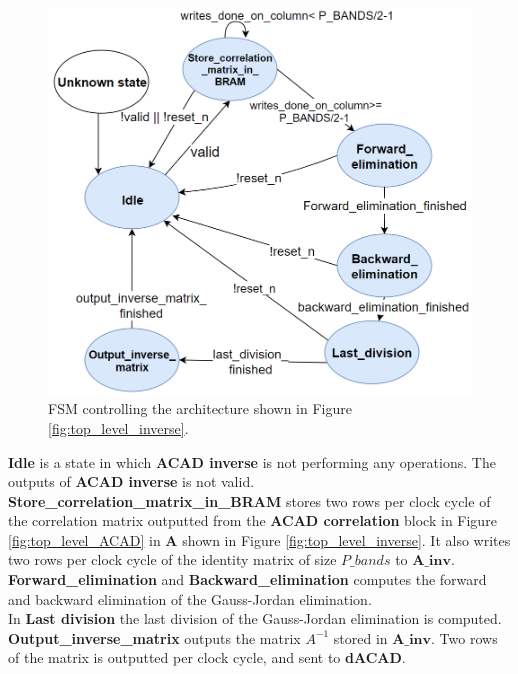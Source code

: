 \begin{figure}[H]
\centering
   \includegraphics[scale=0.3]{images/inverse_hw/fsm_inverse_matrix.PNG}
  \caption{FSM controlling the architecture shown in Figure \ref{fig:top_level_inverse}.  } 
  \label{fig:fsm_inverse_matrix}
\end{figure}


\textbf{Idle} is a state in which \textbf{ACAD inverse} is not performing any operations. The outputs of \textbf{ACAD inverse} is not valid. \\

\textbf{Store\_correlation\_matrix\_in\_BRAM} stores two rows per clock cycle of the correlation matrix outputted from the \textbf{ACAD correlation} block in Figure \ref{fig:top_level_ACAD} in  \textbf{A} shown in Figure \ref{fig:top_level_inverse}. It also writes two rows per clock cycle of the identity matrix of size $P\_bands$ to $\textbf{A\_inv}$. \\

\textbf{Forward\_elimination} and \textbf{Backward\_elimination} computes the forward and backward elimination
of the Gauss-Jordan elimination.\\

In \textbf{Last division} the last division of the Gauss-Jordan elimination is computed.\\

\textbf{Output\_inverse\_matrix} outputs the matrix $A^{-1}$ stored in $\textbf{A\_inv}$. Two rows of the matrix is outputted per clock cycle, and sent to \textbf{dACAD}. 



